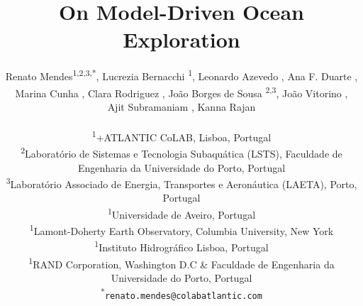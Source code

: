 \documentclass[11pt]{article}
\title{On Model-Driven Ocean Exploration}
\author{
Renato Mendes\textsuperscript{1,2,3,*},
Lucrezia Bernacchi \textsuperscript{1},
Leonardo Azevedo \textsuperscript{},
Ana F. Duarte \textsuperscript{},\\
Marina Cunha \textsuperscript{},
Clara Rodriguez \textsuperscript{},
João Borges de Sousa \textsuperscript{2,3},
João Vitorino \textsuperscript{},\\
Ajit Subramaniam \textsuperscript{},
Kanna Rajan \textsuperscript{}
\\
\\
\textsuperscript{1}{\scriptsize +ATLANTIC CoLAB, Lisboa, Portugal}\\
\textsuperscript{2}{\scriptsize Laboratório de Sistemas e Tecnologia Subaquática (LSTS), Faculdade de Engenharia da Universidade do Porto, Portugal}\\
\textsuperscript{3}{\scriptsize Laboratório Associado de Energia, Transportes e Aeronáutica (LAETA), Porto, Portugal}\\
\textsuperscript{1}{\scriptsize Universidade de Aveiro, Portugal}\\
\textsuperscript{1}{\scriptsize Lamont-Doherty Earth Observatory, Columbia University, New York}\\
\textsuperscript{1}{\scriptsize Instituto Hidrogr{\'a}fico Lisboa, Portugal}\\
\textsuperscript{1}{\scriptsize RAND Corporation, Washington D.C \& Faculdade de Engenharia da Universidade do Porto, Portugal}\\
\textsuperscript{*}\texttt{{\scriptsize renato.mendes@colabatlantic.com}}
}
\date{}
\begin{document}

\maketitle

%





\footnotesize{
  
}
\end{document}

